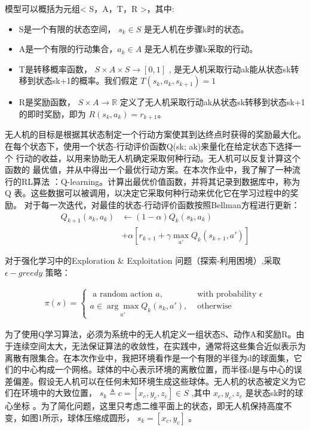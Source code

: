 \documentclass{thuemp}
\begin{document}
模型可以概括为元组< S，A，T，R >，其中:
\begin{itemize}
\item S是一个有限的状态空间， $ s_{k} \in S $ 是无人机在步骤k时的状态。
\item A是一个有限的行动集合，$ a_{k} \in A $ 是无人机在步骤k采取的行动。
\item T是转移概率函数， $  S \times A \times   S \rightarrow[0,1] $ , 是无人机采取行动ak能从状态sk转移到状态sk+1的概率。我们假定 $ T\left(s_{k}, a_{k}, s_{k+1}\right)=1 $
\item R是奖励函数， $ S \times A \rightarrow \mathbb{R} $ 定义了无人机采取行动ak从状态sk转移到状态sk+1的即时奖励，即为 $ R\left(s_{k}, a_{k}\right)=r_{k+1} $。
\end{itemize}
无人机的目标是根据其状态制定一个行动方案使其到达终点时获得的奖励最大化。
在每个状态下，使用一个状态-行动评价函数Q(sk; ak)来量化在给定状态下选择一个
行动的收益，以用来协助无人机确定采取何种行动。无人机可以反复计算这个函数的
最优值，并从中得出一个最优行动方案。在本次作业中，我了解了一种流行的RL算法
：Q-learning\cite{1992Q}。计算出最优价值函数，并将其记录到数据库中，称为Q
表。这些数据可以被调用，以决定它采取何种行动来优化它在学习过程中的奖励。
对于每一次迭代，对最佳的状态-行动评价函数按照Bellman方程进行更新：
\begin{equation}\label{EQ1}
\begin{aligned}
Q_{k+1}\left(s_{k}, a_{k}\right) & \leftarrow(1-\alpha) Q_{k}\left(s_{k}, a_{k}\right) \\
&+\alpha\left[r_{k+1}+\gamma \max _{a \prime} Q_{k}\left(s_{k+1}, a \prime\right)\right]
\end{aligned}
\end{equation}

对于强化学习中的Exploration \& Exploitation 问题（探索-利用困境）,采取 $ \epsilon -greedy $ 策略：

\begin{equation}\label{EQ2}
\begin{aligned}
\pi(s)=\left\{\begin{array}{ll}
\text { a random action } a, & \text { with probability } \epsilon \\
a \in \underset{a \prime}{\arg \max } Q_{k}\left(s_{k}, a \prime\right), & \text { otherwise }
\end{array}\right.
\end{aligned}
\end{equation}


为了使用Q学习算法，必须为系统中的无人机定义一组状态S、动作A和奖励R。由于连续空间太大，无法保证算法的收敛性，在实践中，通常将这些集合近似表示为离散有限集合。在本次作业中，我把环境看作是一个有限的半径为d的球面集，它们的中心构成一个网格。球体的中心表示环境的离散位置，而半径d是与中心的误差偏差。假设无人机可以在任何未知环境生成这些球体。无人机的状态被定义为它们在环境中的大致位置， $ s_{k} \triangleq c=\left[x_{c}, y_{c}, z_{c}\right] \in S $ ,其中 $ x_{c}, y_{c}, z_{c} $ 是状态sk时的球心坐标
。为了简化问题，这里只考虑二维平面上的状态，即无人机保持高度不变，如图1所示，球体压缩成圆形， $ s_{k} =\left[x_{c}, y_{c}\right]  $ 。
\end{document}
